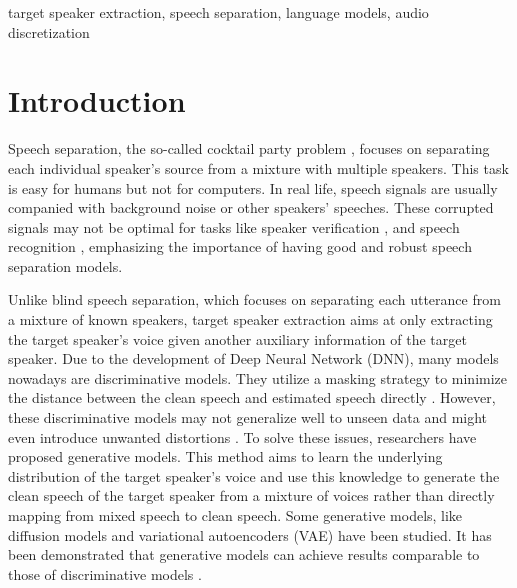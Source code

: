 \documentclass[conference]{IEEEtran}
\begin{document}
\begin{IEEEkeywords}
target speaker extraction, speech separation, language models, audio discretization
\end{IEEEkeywords}

\section{Introduction}
Speech separation, the so-called cocktail party problem \cite{cocktail}, focuses on separating each individual speaker's source from a mixture with multiple speakers. This task is easy for humans but not for computers. 
In real life, speech signals are usually companied with background noise or other speakers' speeches. 
These corrupted signals may not be optimal for tasks like speaker verification \cite{rao2019targetspeakerextractionoverlapped,9414017}, and speech recognition \cite{molkov2017SpeakerAwareNN, 8462661}, emphasizing the importance of having good and robust 
speech separation models.

Unlike blind speech separation, which focuses on separating each utterance from a mixture 
of known speakers, target speaker extraction aims at only extracting the 
target speaker's voice given another auxiliary information of the target speaker. Due to the 
development of Deep Neural Network (DNN), many models nowadays are discriminative models. They 
utilize a masking strategy to minimize the distance between the clean speech and estimated 
speech directly \cite{luo2019conv,spex_plus,sepformer,sef_net}. However, these discriminative 
models may not generalize well to unseen data and might even introduce unwanted distortions \cite{distortion}. To solve these issues, researchers have proposed generative models. This method aims to learn the underlying distribution of the target speaker's voice and use this knowledge to generate the clean speech of the target speaker from a mixture of voices rather 
than directly mapping from mixed speech to clean speech. Some generative models, like diffusion
models \cite{target_diff} and variational autoencoders (VAE) \cite{vae} have been studied. It has been demonstrated that generative models can achieve results comparable to those of discriminative models \cite{target_diff,tokensplit}.
\end{document}
